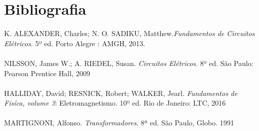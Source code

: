 \documentclass[a4paper, 12pt]{article}
\begin{document}
\section*{Bibliografia}
\footnotesize{

\noindent 
K. ALEXANDER, Charles; N. O. SADIKU, Matthew.\textit{Fundamentos de Circuitos Elétricos}. 5º ed. Porto Alegre : AMGH, 2013.\\
\\
NILSSON, James W.; A. RIEDEL, Susan. \textit{Circuitos Elétricos}. 8º ed. São Paulo: Pearson Prentice Hall, 2009\\
\\
HALLIDAY, David; RESNICK, Robert; WALKER, Jearl. \textit{Fundamentos de Fisíca, volume 3}: Eletromagnetismo. 10º ed. Rio de Janeiro: LTC, 2016\\ 
\\
MARTIGNONI, Alfonso. \textit{Transformadores}. 8ª ed. São Paulo, Globo. 1991
}
\end{document}
